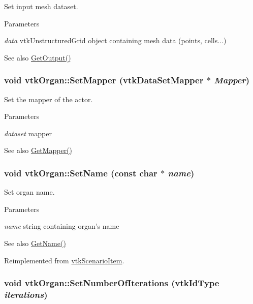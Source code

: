Set input mesh dataset. 
\begin{DoxyParams}{Parameters}
\item[{\em data}]vtkUnstructuredGrid object containing mesh data (points, cells...) \end{DoxyParams}
\begin{DoxySeeAlso}{See also}
\hyperlink{classvtkOrgan_af8cbaa36f1dbf97b5314dfe128aaf444}{GetOutput()} 
\end{DoxySeeAlso}
\hypertarget{classvtkOrgan_aefdce585f74966627c2b5c9d01be8fe3}{
\subsubsection[{SetMapper}]{\setlength{\rightskip}{0pt plus 5cm}void vtkOrgan::SetMapper (vtkDataSetMapper $\ast$ {\em Mapper})}}
\label{classvtkOrgan_aefdce585f74966627c2b5c9d01be8fe3}


Set the mapper of the actor. 
\begin{DoxyParams}{Parameters}
\item[{\em dataset}]mapper \end{DoxyParams}
\begin{DoxySeeAlso}{See also}
\hyperlink{classvtkOrgan_af638d5ed23ec53237ec15089ef5cbadc}{GetMapper()} 
\end{DoxySeeAlso}
\hypertarget{classvtkOrgan_a55ca17e15fea6a6c1672f8b271546e6b}{
\subsubsection[{SetName}]{\setlength{\rightskip}{0pt plus 5cm}void vtkOrgan::SetName (const char $\ast$ {\em name})}}
\label{classvtkOrgan_a55ca17e15fea6a6c1672f8b271546e6b}


Set organ name. 
\begin{DoxyParams}{Parameters}
\item[{\em name}]string containing organ's name \end{DoxyParams}
\begin{DoxySeeAlso}{See also}
\hyperlink{classvtkOrgan_a8421389b02b00b42b0899b75d00633b4}{GetName()} 
\end{DoxySeeAlso}


Reimplemented from \hyperlink{classvtkScenarioItem_a199f87511e99386bb9f271d91c2d0caf}{vtkScenarioItem}.\hypertarget{classvtkOrgan_a97ed046b7c9b8c3cc87939db46e4ec01}{
\subsubsection[{SetNumberOfIterations}]{\setlength{\rightskip}{0pt plus 5cm}void vtkOrgan::SetNumberOfIterations (vtkIdType {\em iterations})}}
\label{classvtkOrgan_a97ed046b7c9b8c3cc87939db46e4ec01}


